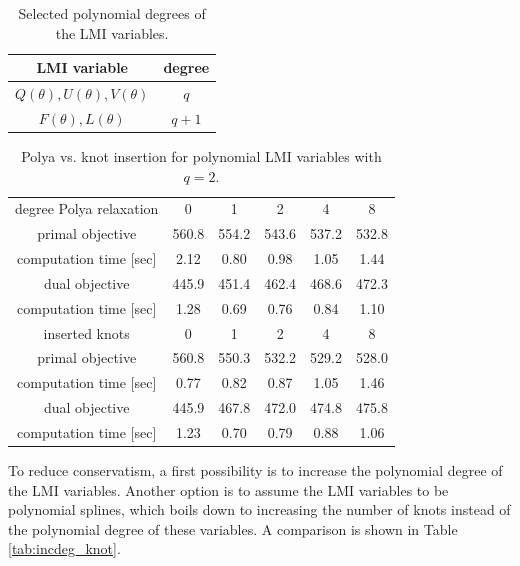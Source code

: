 \documentclass{article}
\newcommand{\ppar}{\theta}                          %
\begin{document}
\begin{table}
	\centering
	\caption{Selected polynomial degrees of the LMI variables.} \vspace{0.2cm}
	\label{tab:degrees}
	\begin{tabular}{cc}
		\toprule
	  LMI variable & degree \\
	  \midrule
		$Q(\ppar),U(\ppar),V(\ppar)$ & $q$ \\
		$F(\ppar), L(\ppar)$ & $q+1$ \\
		\bottomrule
	\end{tabular}
\end{table}

\begin{table}
	\centering
	\caption{Polya vs. knot insertion for polynomial LMI variables with $q = 2$.} \vspace{0.2cm}
	\label{tab:polya_insknot}
	\begin{tabular}{cccccc}
		\toprule
	  degree Polya relaxation & 0     & 1     & 2     & 4     & 8     \\
	  primal objective        & 560.8 & 554.2 & 543.6 & 537.2 & 532.8 \\
	  computation time [sec]  & 2.12  & 0.80  & 0.98  & 1.05  & 1.44  \\
	  dual objective          & 445.9 & 451.4 & 462.4 & 468.6 & 472.3 \\
	  computation time [sec]  & 1.28  & 0.69  & 0.76  & 0.84  & 1.10  \\
	  \midrule
	  inserted knots          & 0     & 1     & 2     & 4     & 8     \\
	  primal objective        & 560.8 & 550.3 & 532.2 & 529.2 & 528.0 \\
	  computation time [sec]  & 0.77  & 0.82  & 0.87  & 1.05  & 1.46  \\
	  dual objective          & 445.9 & 467.8 & 472.0 & 474.8 & 475.8 \\
	  computation time [sec]  & 1.23  & 0.70  & 0.79  & 0.88  & 1.06  \\
		\bottomrule
	\end{tabular}
\end{table}

To reduce conservatism, a first possibility is to increase the polynomial degree of the LMI variables. Another option is to assume the LMI variables to be polynomial splines, which boils down to increasing the number of knots instead of the polynomial degree of these variables. A comparison is shown in Table \ref{tab:incdeg_knot}.
\end{document}
